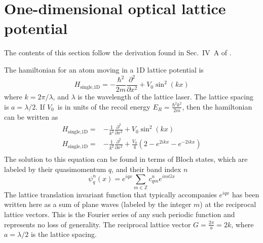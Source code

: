 \documentclass[11pt,letter]{article}
\newcommand{\vo}{\ensuremath{V_{0}}}
\newcommand{\er}{\ensuremath{E_{R}}}
\begin{document}
\section{One-dimensional optical lattice potential}

The contents of this section follow the derivation found in Sec.~IV~A of
\cite{RevModPhys.78.179}.

The hamiltonian for an atom moving in a 1D lattice potential is 
\begin{equation}
  H_{\text{single,1D}} = 
  - \frac{\hbar^{2}}{2m} \frac{\partial^{2}}{\partial x^{2}} 
  + \vo\sin^{2}(kx) 
 \label{eq:Hsingle1D}
\end{equation}
where $k=2\pi/\lambda$, and $\lambda$ is the wavelength of the lattice laser.
The lattice spacing is $a=\lambda/2$.  If \vo\ is in units of the recoil energy
$\er=\frac{\hbar^{2}k^{2}}{2m}$, then the hamiltonian can be written as
\begin{equation}
\begin{split}
  H_{\text{single,1D}}= &
    -\frac{1}{k^{2}} \frac{\partial^{2}}{\partial x^{2}} 
    + \vo\sin^{2}(kx) \\
  H_{\text{single,1D}} = &
    -\frac{1}{k^{2}} \frac{\partial^{2}}{\partial x^{2}} 
    + \frac{\vo}{4}(2 - e^{2ikx} - e^{-2ikx} )  \\
\end{split}
\end{equation}
The solution to this equation can be found in terms of Bloch states, which are
labeled by their quasimomentum $q$, and their band index $n$ \begin{equation}
  \psi_{q}^{n}(x) = e^{iqx} \sum_{m \in \mathbb{Z}} c_{qm}^{n} e^{imGx}
  \label{eq:blochstate}
\end{equation}
The lattice translation invariant function that typically accompanies $e^{iqx}$
has been written here as a sum of plane waves (labeled by the integer $m$) at
the reciprocal lattice vectors.  This is the Fourier series of any such
periodic function and represents no loss of generality.   The reciprocal
lattice vector  $G=\frac{2\pi}{a}=2k$, where $a=\lambda/2$ is the lattice
spacing.  
\end{document}
